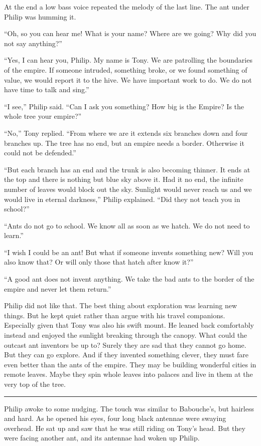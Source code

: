 \documentclass[10pt, draft]{memoir}
\renewcommand{\pfbreakdisplay}{\bigskip \ding{166} \bigskip}
\newcommand{\secbreak}{\fancybreak{\pfbreakdisplay}}
\begin{document}
At the end a low bass voice repeated the melody of the last line. The ant under Philip was humming it.

``Oh, so you can hear me! What is your name? Where are we going? Why did you not say anything?''

``Yes, I can hear you, Philip. My name is Tony. We are patrolling the boundaries of the empire. If someone intruded, something broke, or we found something of value, we would report it to the hive. We have important work to do. We do not have time to talk and sing.”

``I see,'' Philip said. ``Can I ask you something? How big is the Empire? Is the whole tree your empire?''

``No,'' Tony replied. ``From where we are it extends six branches down and four branches up. The tree has no end, but an empire needs a border. Otherwise it could not be defended.''

``But each branch has an end and the trunk is also becoming thinner. It ends at the top and there is nothing but blue sky above it. Had it no end, the infinite number of leaves would block out the sky. Sunlight would never reach us and we would live in eternal darkness,'' Philip explained. ``Did they not teach you in school?''

``Ants do not go to school. We know all as soon as we hatch. We do not need to learn.''

``I wish I could be an ant! But what if someone invents something new? Will you also know that? Or will only those that hatch after know it?''

``A good ant does not invent anything. We take the bad ants to the border of the empire and never let them return.''

Philip did not like that. The best thing about exploration was learning new things. But he kept quiet rather than argue with his travel companions. Especially given that Tony was also his swift mount. He leaned back comfortably instead and enjoyed the sunlight breaking through the canopy. What could the outcast ant inventors be up to? Surely they are sad that they cannot go home. But they can go explore. And if they invented something clever, they must fare even better than the ants of the empire. They may be building wonderful cities in remote leaves. Maybe they spin whole leaves into palaces and live in them at the very top of the tree.

\secbreak

Philip awoke to some nudging. The touch was similar to Babouche's, but hairless and hard. As he opened his eyes, four long black antennae were swaying overhead. He sat up and saw that he was still riding on Tony's head. But they were facing another ant, and its antennae had woken up Philip.
\end{document}
